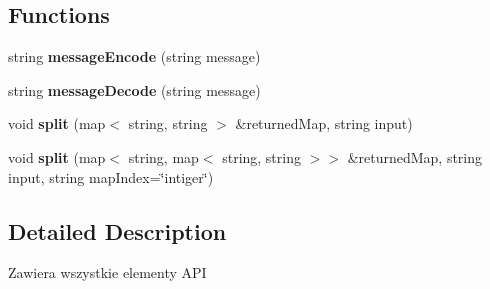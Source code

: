 \subsection*{Functions}
\begin{DoxyCompactItemize}
\item 
string {\bfseries message\+Encode} (string message)\hypertarget{namespace_ts3_api_aced196e110a77c44616fbe90d94edc7e}{}\label{namespace_ts3_api_aced196e110a77c44616fbe90d94edc7e}

\item 
string {\bfseries message\+Decode} (string message)\hypertarget{namespace_ts3_api_ad21f5397ccc853661d734146598da547}{}\label{namespace_ts3_api_ad21f5397ccc853661d734146598da547}

\item 
void {\bfseries split} (map$<$ string, string $>$ \&returned\+Map, string input)\hypertarget{namespace_ts3_api_a07703eef88c4288a04dd84ff342b073b}{}\label{namespace_ts3_api_a07703eef88c4288a04dd84ff342b073b}

\item 
void {\bfseries split} (map$<$ string, map$<$ string, string $>$$>$ \&returned\+Map, string input, string map\+Index=\char`\"{}intiger\char`\"{})\hypertarget{namespace_ts3_api_a99c4f893b8ac36a7d5bb713b7bceda2f}{}\label{namespace_ts3_api_a99c4f893b8ac36a7d5bb713b7bceda2f}

\end{DoxyCompactItemize}


\subsection{Detailed Description}
Zawiera wszystkie elementy A\+PI 